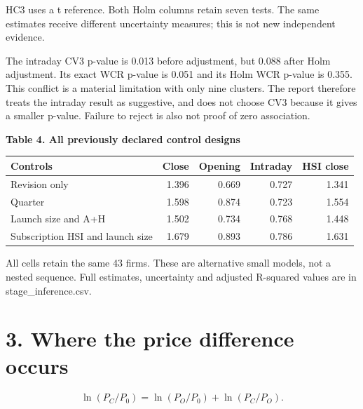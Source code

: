 \documentclass[10pt,a4paper]{article}
\begin{document}
{\footnotesize HC3 uses a t reference. Both Holm columns retain seven tests. The same estimates receive different uncertainty measures; this is not new independent evidence.}\par

The intraday CV3 p-value is 0.013 before adjustment, but 0.088 after Holm adjustment. Its exact WCR p-value is 0.051 and its Holm WCR p-value is 0.355. This conflict is a material limitation with only nine clusters. The report therefore treats the intraday result as suggestive, and does not choose CV3 because it gives a smaller p-value. Failure to reject is also not proof of zero association.

\par\addvspace{5pt}\textbf{Table 4. All previously declared control designs}\par\nobreak\vspace{2pt}

{\small\renewcommand{\arraystretch}{1.10}\begin{tabularx}{\textwidth}{@{}Xrrrr@{}}\toprule

\textbf{Controls} & \textbf{Close} & \textbf{Opening} & \textbf{Intraday} & \textbf{HSI close} \\\midrule

Revision only & 1.396 & 0.669 & 0.727 & 1.341 \\

Quarter & 1.598 & 0.874 & 0.723 & 1.554 \\

Launch size and A+H & 1.502 & 0.734 & 0.768 & 1.448 \\

Subscription HSI and launch size & 1.679 & 0.893 & 0.786 & 1.631 \\

\bottomrule\end{tabularx}}\par

{\footnotesize All cells retain the same 43 firms. These are alternative small models, not a nested sequence. Full estimates, uncertainty and adjusted R-squared values are in stage\_inference.csv.}\par

\clearpage

\section*{3. Where the price difference occurs}

\[
\ln(P_C/P_0)=\ln(P_O/P_0)+\ln(P_C/P_O).
\]
\end{document}
